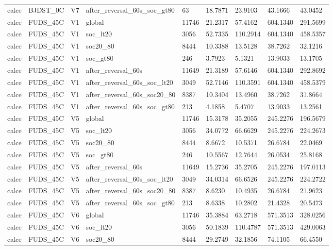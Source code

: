 \begin{tabular}{lllllllll}
calce & BJDST\_0C & V7 & after\_reversal\_60s\_soc\_gt80 & 63 & 18.7871 & 23.9103 & 43.1666 & 43.0452 \\
calce & FUDS\_45C & V1 & global & 11746 & 21.2317 & 57.4162 & 604.1340 & 291.5699 \\
calce & FUDS\_45C & V1 & soc\_lt20 & 3056 & 52.7335 & 110.2914 & 604.1340 & 458.5357 \\
calce & FUDS\_45C & V1 & soc20\_80 & 8444 & 10.3388 & 13.5128 & 38.7262 & 32.1216 \\
calce & FUDS\_45C & V1 & soc\_gt80 & 246 & 3.7923 & 5.1321 & 13.9033 & 13.1705 \\
calce & FUDS\_45C & V1 & after\_reversal\_60s & 11649 & 21.3189 & 57.6146 & 604.1340 & 292.8692 \\
calce & FUDS\_45C & V1 & after\_reversal\_60s\_soc\_lt20 & 3049 & 52.7146 & 110.3591 & 604.1340 & 458.5379 \\
calce & FUDS\_45C & V1 & after\_reversal\_60s\_soc20\_80 & 8387 & 10.3404 & 13.4960 & 38.7262 & 31.8664 \\
calce & FUDS\_45C & V1 & after\_reversal\_60s\_soc\_gt80 & 213 & 4.1858 & 5.4707 & 13.9033 & 13.2561 \\
calce & FUDS\_45C & V5 & global & 11746 & 15.3178 & 35.2055 & 245.2276 & 196.5679 \\
calce & FUDS\_45C & V5 & soc\_lt20 & 3056 & 34.0772 & 66.6629 & 245.2276 & 224.2673 \\
calce & FUDS\_45C & V5 & soc20\_80 & 8444 & 8.6672 & 10.5371 & 26.6784 & 22.0469 \\
calce & FUDS\_45C & V5 & soc\_gt80 & 246 & 10.5567 & 12.7644 & 26.0534 & 25.8168 \\
calce & FUDS\_45C & V5 & after\_reversal\_60s & 11649 & 15.2736 & 35.2705 & 245.2276 & 197.0113 \\
calce & FUDS\_45C & V5 & after\_reversal\_60s\_soc\_lt20 & 3049 & 34.0314 & 66.6526 & 245.2276 & 224.2722 \\
calce & FUDS\_45C & V5 & after\_reversal\_60s\_soc20\_80 & 8387 & 8.6230 & 10.4935 & 26.6784 & 21.9623 \\
calce & FUDS\_45C & V5 & after\_reversal\_60s\_soc\_gt80 & 213 & 8.6338 & 10.2802 & 21.4328 & 20.5473 \\
calce & FUDS\_45C & V6 & global & 11746 & 35.3884 & 63.2718 & 571.3513 & 328.0256 \\
calce & FUDS\_45C & V6 & soc\_lt20 & 3056 & 50.1839 & 110.4787 & 571.3513 & 429.0063 \\
calce & FUDS\_45C & V6 & soc20\_80 & 8444 & 29.2749 & 32.1856 & 74.1105 & 66.4550 \\

\end{tabular}
